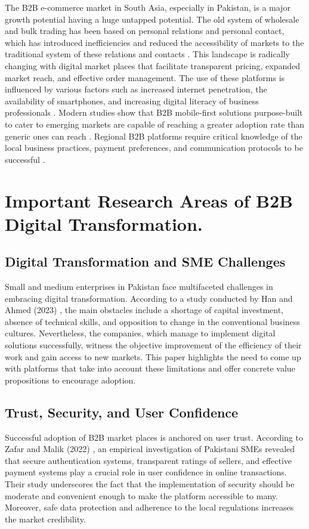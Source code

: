 The B2B e-commerce market in South Asia, especially in Pakistan, is a major growth potential having a huge untapped potential. The old system of wholesale and bulk trading has been based on personal relations and personal contact, which has introduced inefficiencies and reduced the accessibility of markets to the traditional system of these relations and contacts \cite{ali2022ecommerce}. This landscape is radically changing with digital market places that facilitate transparent pricing, expanded market reach, and effective order management. The use of these platforms is influenced by various factors such as increased internet penetration, the availability of smartphones, and increasing digital literacy of business professionals \cite{farooq2024mobile}. Modern studies show that B2B mobile-first solutions purpose-built to cater to emerging markets are capable of reaching a greater adoption rate than generic ones can reach \cite{shaikh2024design}. Regional B2B platforms require critical knowledge of the local business practices, payment preferences, and communication protocols to be successful \cite{hussain2023supply}.

\section{Important Research Areas of B2B Digital Transformation.}

\subsection{Digital Transformation and SME Challenges}
Small and medium enterprises in Pakistan face multifaceted challenges in embracing digital transformation. According to a study conducted by Han and Ahmed (2023) \cite{han2023digital}, the main obstacles include a shortage of capital investment, absence of technical skills, and opposition to change in the conventional business cultures. Nevertheless, the companies, which manage to implement digital solutions successfully, witness the objective improvement of the efficiency of their work and gain access to new markets. This paper highlights the need to come up with platforms that take into account these limitations and offer concrete value propositions to encourage adoption.

\subsection{Trust, Security, and User Confidence}
Successful adoption of B2B market places is anchored on user trust. According to Zafar and Malik (2022) \cite{zafar2022trust}, an empirical investigation of Pakistani SMEs revealed that secure authentication systems, transparent ratings of sellers, and effective payment systems play a crucial role in user confidence in online transactions. Their study underscores the fact that the implementation of security should be moderate and convenient enough to make the platform accessible to many. Moreover, safe data protection and adherence to the local regulations increases the market credibility.

